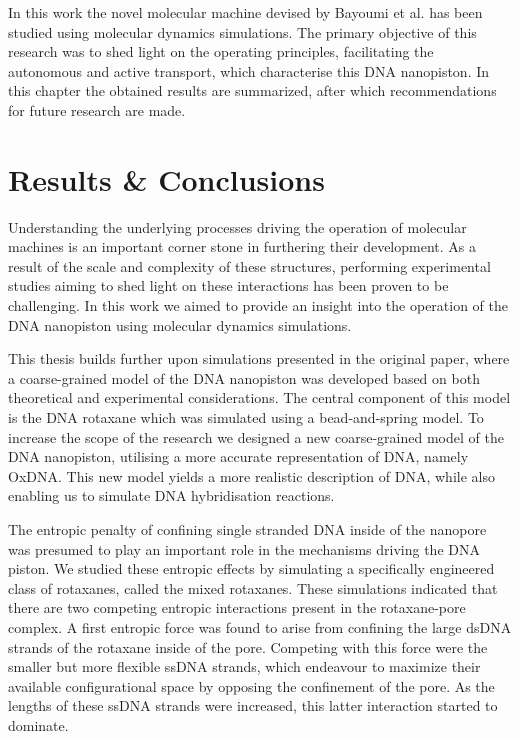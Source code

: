 \noindent In this work the novel molecular machine devised by Bayoumi et al. has been
studied using
molecular dynamics simulations. The primary objective of this research was to shed
light on the operating principles, facilitating the autonomous and active transport,
which
characterise this DNA nanopiston. In this chapter the obtained results are summarized,
after which recommendations for future research are made.

\section{Results \& Conclusions}

Understanding the underlying processes driving the operation of molecular machines is an
important corner stone in furthering their development. As a result of the scale and
complexity of these structures, performing  experimental studies aiming to shed light on
these interactions has been proven to be challenging. In this work we aimed to provide an
insight into the operation of the
DNA nanopiston using molecular dynamics simulations.

This thesis builds further upon simulations presented in the original paper, where a
coarse-grained model of the DNA nanopiston was developed based on both theoretical and
experimental considerations. The central component of this model is the DNA rotaxane
which was simulated using a bead-and-spring model. To increase the scope of the research
we designed a new coarse-grained model of the DNA nanopiston, utilising a more accurate
representation of DNA, namely OxDNA. This new model yields a more realistic description
of DNA, while also enabling us to simulate DNA hybridisation reactions.

The entropic penalty of confining single stranded DNA inside of the nanopore was presumed
to play an important role in the mechanisms driving the DNA piston. We studied these
entropic effects by simulating a specifically engineered class of rotaxanes, called the
mixed rotaxanes. These simulations indicated that there are two competing entropic
interactions present in the rotaxane-pore complex. A first entropic force was found to
arise from confining the large dsDNA strands of the rotaxane inside of the pore.
Competing with this force were the smaller but more flexible ssDNA strands, which
endeavour to maximize their available configurational space by opposing the confinement
of the pore. As the lengths of these ssDNA strands were increased, this latter
interaction started to dominate.

